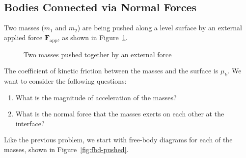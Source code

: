 
\subsection{Bodies Connected via Normal Forces}
Two masses ($m_1$ and $m_2$) are being pushed along a level surface by an
external applied force $\bm F_\text{app}$, as shown in Figure~\ref{fig:pushed}.
\begin{figure}[ht]
  \centering
  \caption{Two masses pushed together by an external force}
  \label{fig:pushed}
\end{figure}
The coefficient of kinetic friction between the masses and the surface is
$\mu_k$. We want to consider the following questions:
\begin{enumerate}[itemsep=6pt]
\item What is the magnitude of acceleration of the masses?
\item What is the normal force that the masses exerts on each other at the
  interface?
\end{enumerate}
Like the previous problem, we start with free-body diagrams for each of the
masses, shown in Figure~\ref{fig:fbd-pushed}.
